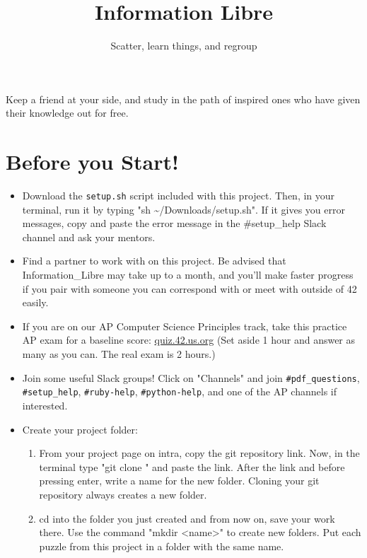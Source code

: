 \documentclass{42-en}
\begin{document}
\title{Information Libre}
\subtitle{Scatter, learn things, and regroup}


\summary
{
	Keep a friend at your side, and study in the path of inspired ones who have given their knowledge out for free. 
}

\maketitle

\tableofcontents


\chapter{Before you Start!}

\begin{itemize}

	\item Download the \texttt{setup.sh} script included with this project. Then, in your terminal, run it by typing "sh \textasciitilde/Downloads/setup.sh". If it gives you error messages, copy and paste the error message in the \#setup\_help Slack channel and ask your mentors.
	\item Find a partner to work with on this project. Be advised that Information\_Libre may take up to a month, and you'll make faster progress if you pair with someone you can correspond with or meet with outside of 42 easily.
	\item If you are on our AP Computer Science Principles track, take this practice AP exam for a baseline score: \url{quiz.42.us.org} (Set aside 1 hour and answer as many as you can. The real exam is 2 hours.)
	\item Join some useful Slack groups! Click on "Channels" and join \texttt{\#pdf\_questions}, \texttt{\#setup\_help}, \texttt{\#ruby-help}, \texttt{\#python-help}, and one of the AP channels if interested.
	\item Create your project folder:
	\begin{enumerate}
		\item From your project page on intra, copy the git repository link. Now, in the terminal type "git clone " and paste the link. After the link and before pressing enter, write a name for the new folder. Cloning your git repository always creates a new folder.
		\item cd into the folder you just created and from now on, save your work there. Use the command "mkdir <name>" to create new folders. Put each puzzle from this project in a folder with the same name.
	\end{enumerate}
\end{itemize}
\end{document}
